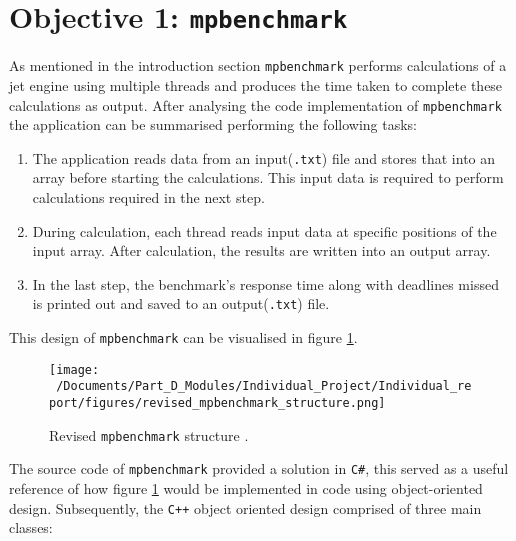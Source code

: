 \section{Objective 1: \texttt{mpbenchmark}}
As mentioned in the introduction section \texttt{mpbenchmark} performs calculations of a jet engine using multiple threads and produces the time taken to complete these calculations as output. After analysing the code implementation of \texttt{mpbenchmark} the application can be summarised performing the following tasks:

\begin{enumerate}
	\item The application reads data from an input(\texttt{.txt}) file and stores that into an array before starting the calculations. This input data is required to perform calculations required in the next step. 
	\item During calculation, each thread reads input data at specific positions of the input array. After calculation, the results are written into an output array.
	\item In the last step, the benchmark’s response time along with deadlines missed is printed out and saved to an output(\texttt{.txt}) file. 
\end{enumerate}

This design of \texttt{mpbenchmark} can be visualised in figure \ref*{fig:revised_mpbenchmark_structure}.

\begin{figure}[h] %
	\centering
	\texttt{[image: ~/Documents/Part\_D\_Modules/Individual\_Project/Individual\_report/figures/revised\_mpbenchmark\_structure.png]} %
	\caption{Revised \texttt{mpbenchmark} structure \cite{mpbenchmark_paper}.}
	\label{fig:revised_mpbenchmark_structure} %
\end{figure}

The source code of \texttt{mpbenchmark} provided a solution in \texttt{C\#}, this served as a useful reference of how figure \ref*{fig:revised_mpbenchmark_structure} would be implemented in code using object-oriented design. Subsequently, the \texttt{C++} object oriented design comprised of three main classes:

